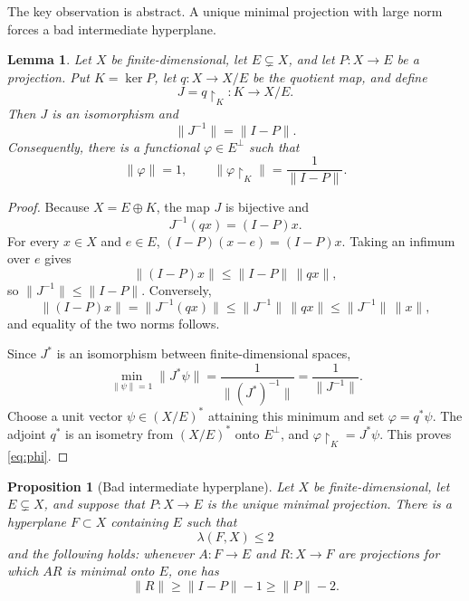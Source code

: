 \documentclass[11pt]{article}
\newtheorem{proposition}[theorem]{Proposition}
\newtheorem{lemma}[theorem]{Lemma}
\theoremstyle{remark}
\newcommand{\Id}{I}
\newcommand{\restr}[2]{#1\!\restriction_{#2}}
\begin{document}
The key observation is abstract.  A unique minimal projection with large norm
forces a bad intermediate hyperplane.

\begin{lemma}\label{lem:quotient}
Let $X$ be finite-dimensional, let $E\subsetneq X$, and let $P:X\to E$ be a
projection.  Put $K=\ker P$, let $q:X\to X/E$ be the quotient map, and define
\[
       J=\restr{q}{K}:K\longrightarrow X/E.
\]
Then $J$ is an isomorphism and
\[
       \|J^{-1}\|=\|\Id-P\|.
\]
Consequently, there is a functional $\varphi\in E^\perp$ such that
\begin{equation}\label{eq:phi}
       \|\varphi\|=1,
       \qquad
       \bigl\|\restr{\varphi}{K}\bigr\|
       =\frac{1}{\|\Id-P\|}.
\end{equation}
\end{lemma}

\begin{proof}
Because $X=E\oplus K$, the map $J$ is bijective and
\[
       J^{-1}(q x)=(\Id-P)x.
\]
For every $x\in X$ and $e\in E$,
$(\Id-P)(x-e)=(\Id-P)x$.  Taking an infimum over $e$ gives
\[
 \|(\Id-P)x\|\leq \|\Id-P\|\,\|qx\|,
\]
so $\|J^{-1}\|\leq\|\Id-P\|$.  Conversely,
\[
 \|(\Id-P)x\|=\|J^{-1}(qx)\|
 \leq \|J^{-1}\|\,\|qx\|
 \leq \|J^{-1}\|\,\|x\|,
\]
and equality of the two norms follows.

Since $J^*$ is an isomorphism between finite-dimensional spaces,
\[
 \min_{\|\psi\|=1}\|J^*\psi\|
   =\frac{1}{\|(J^*)^{-1}\|}
   =\frac{1}{\|J^{-1}\|}.
\]
Choose a unit vector $\psi\in(X/E)^*$ attaining this minimum and set
$\varphi=q^*\psi$.  The adjoint $q^*$ is an isometry from $(X/E)^*$ onto
$E^\perp$, and $\restr{\varphi}{K}=J^*\psi$.  This proves
\eqref{eq:phi}.
\end{proof}

\begin{proposition}[Bad intermediate hyperplane]\label{prop:hyperplane}
Let $X$ be finite-dimensional, let $E\subsetneq X$, and suppose that
$P:X\to E$ is the unique minimal projection.  There is a hyperplane
$F\subset X$ containing $E$ such that
\[
       \lambda(F,X)\leq 2
\]
and the following holds: whenever $A:F\to E$ and $R:X\to F$ are projections
for which $AR$ is minimal onto $E$, one has
\begin{equation}\label{eq:badR}
       \|R\|\geq \|\Id-P\|-1\geq \|P\|-2.
\end{equation}
\end{proposition}
\end{document}
